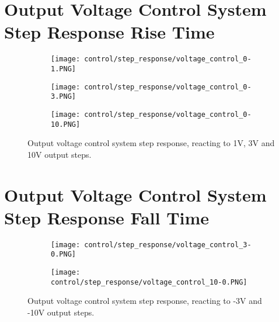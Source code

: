 \section*{Output Voltage Control System Step Response Rise Time} \label{A:control_step_rise}
\begin{figure}[H]
    \centering
    \begin{subfigure}{0.62\textwidth}
        \texttt{[image: control/step\_response/voltage\_control\_0-1.PNG]}
    \end{subfigure}
    \begin{subfigure}{0.62\textwidth}
        \texttt{[image: control/step\_response/voltage\_control\_0-3.PNG]}
    \end{subfigure}
    \begin{subfigure}{0.62\textwidth}
        \texttt{[image: control/step\_response/voltage\_control\_0-10.PNG]}
    \end{subfigure}
    \caption{Output voltage control system step response, reacting to 1V, 3V and 10V output steps.}
\end{figure}

\section*{Output Voltage Control System Step Response Fall Time} \label{A:control_step_fall}
\begin{figure}[H]
    \centering
    \begin{subfigure}{0.7\textwidth}
        \texttt{[image: control/step\_response/voltage\_control\_3-0.PNG]}
    \end{subfigure}
    \begin{subfigure}{0.7\textwidth}
        \texttt{[image: control/step\_response/voltage\_control\_10-0.PNG]}
    \end{subfigure}
    \caption{Output voltage control system step response, reacting to -3V and -10V output steps.}
\end{figure}

